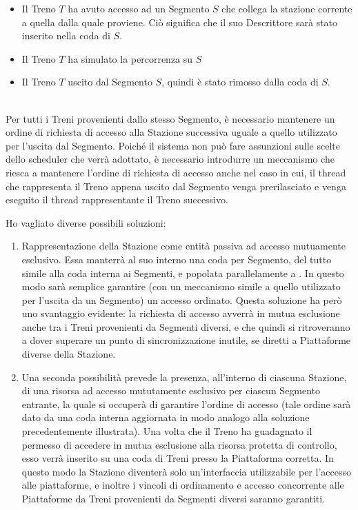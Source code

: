 			\begin{itemize}
				\item Il Treno $T$ ha avuto accesso ad un Segmento $S$ che collega la stazione corrente a quella dalla quale proviene. Ciò significa che il suo Descrittore sarà stato inserito nella coda  di $ S $.
				\item Il Treno $T$ ha simulato la percorrenza su $S$ 
				\item Il Treno $T$ uscito dal Segmento $S$, quindi è stato rimosso dalla coda  di $S$.
			\end{itemize}
			
		\begin{description}
			
			\item{}\\
		
		Per tutti i Treni provenienti dallo stesso Segmento, è necessario mantenere un ordine di richiesta di accesso alla Stazione successiva uguale a quello utilizzato per l'uscita dal Segmento. Poiché il sistema non può fare assunzioni sulle scelte dello scheduler che verrà adottato, è necessario introdurre un meccanismo che riesca a mantenere l'ordine di richiesta di accesso anche nel caso in cui, il thread che rappresenta il Treno appena uscito dal Segmento venga prerilasciato e venga eseguito il thread rappresentante il Treno successivo.

		Ho vagliato diverse possibili soluzioni:
		\begin{enumerate}
			\item Rappresentazione della Stazione come entità passiva ad accesso mutuamente esclusivo. Essa manterrà al suo interno una coda per Segmento, del tutto simile alla coda  interna ai Segmenti, e popolata parallelamente a . In questo modo sarà semplice garantire (con un meccanismo simile a quello utilizzato per l'uscita da un Segmento) un accesso ordinato. Questa soluzione ha però uno svantaggio evidente: la richiesta di accesso avverrà in mutua esclusione anche tra i Treni provenienti da Segmenti diversi, e che quindi si ritroveranno a dover superare un punto di sincronizzazione inutile, se diretti a Piattaforme diverse della Stazione.
			\item Una seconda possibilità prevede la presenza, all'interno di ciascuna Stazione, di una risorsa ad accesso mututamente esclusivo per ciascun Segmento entrante, la quale si occuperà di garantire l'ordine di accesso (tale ordine sarà dato da una coda interna aggiornata in modo analogo alla soluzione precedentemente illustrata). Una volta che il Treno ha guadagnato il permesso di accedere in mutua esclusione alla risorsa protetta di controllo, esso verrà inserito su una coda di Treni presso la Piattaforma corretta.
			In questo modo la Stazione diventerà solo un'interfaccia utilizzabile per l'accesso alle piattaforme, e inoltre i vincoli di ordinamento e accesso concorrente alle Piattaforme da Treni provenienti da Segmenti diversi saranno garantiti.
			

\end{enumerate}
\end{description}
